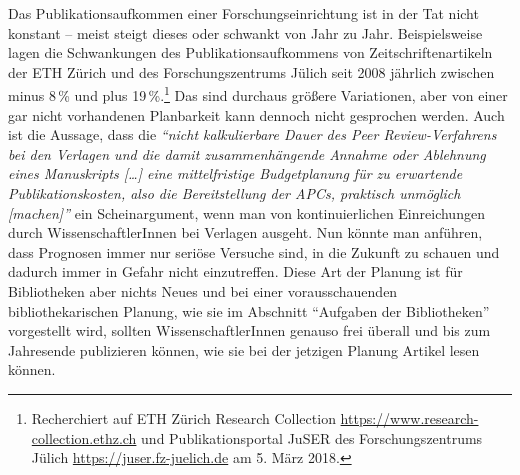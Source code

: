 \documentclass[a4paper,
fontsize=11pt,
oneside,
numbers=noperiodatend,
parskip=half-,
bibliography=totoc,
final
]{scrartcl}
\begin{document}
Das Publikationsaufkommen einer Forschungseinrichtung ist in der Tat
nicht konstant -- meist steigt dieses oder schwankt von Jahr zu Jahr.
Beispielsweise lagen die Schwankungen des Publikationsaufkommens von
Zeitschriftenartikeln der ETH Zürich und des Forschungszentrums Jülich
seit 2008 jährlich zwischen minus 8\,\% und plus 19\,\%.\footnote{Recherchiert
  auf ETH Zürich Research Collection
  \url{https://www.research-collection.ethz.ch} und Publikationsportal
  JuSER des Forschungszentrums Jülich \url{https://juser.fz-juelich.de}
  am 5. März 2018.} Das sind durchaus größere Variationen, aber von
einer gar nicht vorhandenen Planbarkeit kann dennoch nicht gesprochen
werden. Auch ist die Aussage, dass die \emph{\enquote{nicht
kalkulierbare Dauer des Peer Review-Verfahrens bei den Verlagen und die
damit zusammenhängende Annahme oder Ablehnung eines Manuskripts
{[}\ldots{}{]} eine mittelfristige Budgetplanung für zu erwartende
Publikationskosten, also die Bereitstellung der APCs, praktisch
unmöglich {[}machen{]}}} ein Scheinargument, wenn man von
kontinuierlichen Einreichungen durch WissenschaftlerInnen bei Verlagen
ausgeht. Nun könnte man anführen, dass Prognosen immer nur seriöse
Versuche sind, in die Zukunft zu schauen und dadurch immer in Gefahr
nicht einzutreffen. Diese Art der Planung ist für Bibliotheken aber
nichts Neues und bei einer vorausschauenden bibliothekarischen Planung,
wie sie im Abschnitt \enquote{Aufgaben der Bibliotheken} vorgestellt
wird, sollten WissenschaftlerInnen genauso frei überall und bis zum
Jahresende publizieren können, wie sie bei der jetzigen Planung Artikel
lesen können.
\end{document}
